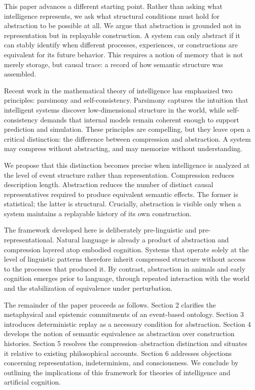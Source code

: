 \documentclass[11pt]{article}
\begin{document}
This paper advances a different starting point. Rather than asking what intelligence represents, we ask what structural conditions must hold for abstraction to be possible at all. We argue that abstraction is grounded not in representation but in replayable construction. A system can only abstract if it can stably identify when different processes, experiences, or constructions are equivalent for its future behavior. This requires a notion of memory that is not merely storage, but causal trace: a record of how semantic structure was assembled.

Recent work in the mathematical theory of intelligence has emphasized two principles: parsimony and self-consistency. Parsimony captures the intuition that intelligent systems discover low-dimensional structure in the world, while self-consistency demands that internal models remain coherent enough to support prediction and simulation. These principles are compelling, but they leave open a critical distinction: the difference between compression and abstraction. A system may compress without abstracting, and may memorize without understanding.

We propose that this distinction becomes precise when intelligence is analyzed at the level of event structure rather than representation. Compression reduces description length. Abstraction reduces the number of distinct causal representatives required to produce equivalent semantic effects. The former is statistical; the latter is structural. Crucially, abstraction is visible only when a system maintains a replayable history of its own construction.

The framework developed here is deliberately pre-linguistic and pre-representational. Natural language is already a product of abstraction and compression layered atop embodied cognition. Systems that operate solely at the level of linguistic patterns therefore inherit compressed structure without access to the processes that produced it. By contrast, abstraction in animals and early cognition emerges prior to language, through repeated interaction with the world and the stabilization of equivalence under perturbation.

The remainder of the paper proceeds as follows. Section 2 clarifies the metaphysical and epistemic commitments of an event-based ontology. Section 3 introduces deterministic replay as a necessary condition for abstraction. Section 4 develops the notion of semantic equivalence as abstraction over construction histories. Section 5 resolves the compression–abstraction distinction and situates it relative to existing philosophical accounts. Section 6 addresses objections concerning representation, indeterminism, and consciousness. We conclude by outlining the implications of this framework for theories of intelligence and artificial cognition.
\end{document}
